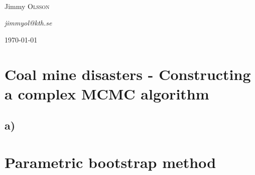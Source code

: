 \documentclass[11pt]{article}
\begin{document}
\begin{titlepage}
\begin{minipage}{0.5\textwidth}\begin{flushleft} 
\end{flushleft}\end{minipage}\\
\begin{minipage}{0.5\textwidth}\begin{flushleft} 
Jimmy \textsc{Olsson}
\end{flushleft}\end{minipage}
\begin{minipage}{0.5\textwidth}\begin{flushright} 
\textit{jimmyol@kth.se}
\end{flushright}\end{minipage}
\vfill
\begin{center}
{\large \today}
\end{center}
\end{titlepage}

\section*{Coal mine disasters - Constructing a complex MCMC algorithm}



\subsection*{a)}











\newpage
\section*{Parametric bootstrap method}









\end{document}
